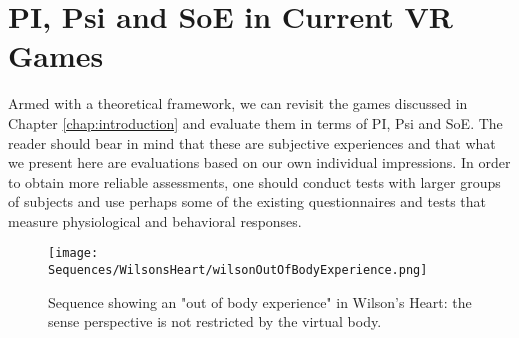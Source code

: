 \section{PI, Psi and SoE in Current VR Games}
\label{sec:soaRevisited}

Armed with a theoretical framework, we can revisit the games discussed in Chapter \ref{chap:introduction} and evaluate them in terms of PI, Psi and SoE. The reader should bear in mind that these are subjective experiences and that what we present here are evaluations based on our own individual impressions. In order to obtain more reliable assessments, one should conduct tests with larger groups of subjects and use perhaps some of the existing questionnaires and tests that measure physiological and behavioral responses.

\begin{figure}[h]
\centering
\texttt{[image: Sequences/WilsonsHeart/wilsonOutOfBodyExperience.png]}
\caption{Sequence showing an "out of body experience" in Wilson's Heart: the sense perspective is not restricted by the virtual body.}
\label{fig:wilsonPenetration}
\end{figure}

